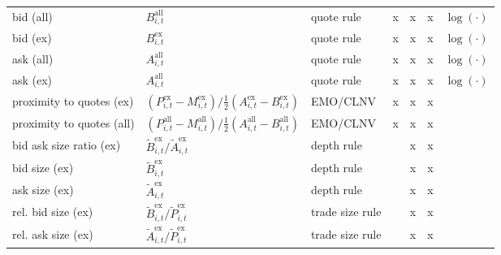 \begin{threeparttable}
\begin{tabular}{@{}lllllll@{}}
        bid (all)                 & $B_{i, t}^{\text{all}}$                                                                                        & quote rule           & x    & x    & x    & $\log(\cdot)$ \\
        bid (ex)                  & $B_{i, t}^{\text{ex}}$                                                                                         & quote rule           & x    & x    & x    & $\log(\cdot)$ \\
        ask (all)                 & $A_{i, t}^{\text{all}}$                                                                                        & quote rule           & x    & x    & x    & $\log(\cdot)$ \\
        ask (ex)                  & $A_{i, t}^{\text{all}}$                                                                                        & quote rule           & x    & x    & x    & $\log(\cdot)$ \\
        proximity to quotes (ex)  & $(P_{i, t}^{\text{ex}}- M_{i, t}^{\text{ex}}) / \tfrac{1}{2} (A_{i, t}^{\text{ex}}- B_{i, t}^{\text{ex}})$     & \gls{EMO}/\gls{CLNV} & x    & x    & x    &               \\
        proximity to quotes (all) & $(P_{i, t}^{\text{all}}- M_{i, t}^{\text{all}}) / \tfrac{1}{2} (A_{i, t}^{\text{all}}- B_{i, t}^{\text{all}})$ & \gls{EMO}/\gls{CLNV} & x    & x    & x    &               \\
        bid ask size ratio (ex)   & $\tilde{B}_{i, t}^{\text{ex}}/\tilde{A}_{i, t}^{\text{ex}}$                                                    & depth rule           &      & x    & x    &               \\
        bid size (ex)             & $\tilde{B}_{i, t}^{\text{ex}}$                                                                                 & depth rule           &      & x    & x    &               \\
        ask size (ex)             & $\tilde{A}_{i, t}^{\text{ex}}$                                                                                 & depth rule           &      & x    & x    &               \\
        rel. bid size (ex)        & $\tilde{B}_{i, t}^{\text{ex}}/\tilde{P}_{i, t}^{\text{ex}}$                                                    & trade size rule      &      & x    & x    &               \\
        rel. ask size (ex)        & $\tilde{A}_{i, t}^{\text{ex}}/\tilde{P}_{i, t}^{\text{ex}}$                                                    & trade size rule      &      & x    & x    &               \\

\end{tabular}
\end{threeparttable}
